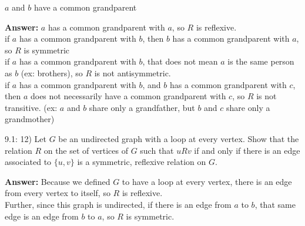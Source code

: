 \documentclass{article}
\newenvironment{answer}
{\color{PineGreen}\begin{list}{}%
         {\setlength{\leftmargin}{1cm}}%
         \item[]%
        \textbf{Answer: }}
{\end{list}}
\begin{document}
\begin{enumerate}[label=\alph{enumi})]
\item $a$ and $b$ have a common grandparent
\begin{answer}
$a$ has a common grandparent with $a$, so $R$ is reflexive.\\
if $a$ has a common grandparent with $b$, then $b$ has a common grandparent with $a$, so $R$ is symmetric\\
if $a$ has a common grandparent with $b$, that does not mean $a$ is the same person as $b$ (ex: brothers), so $R$ is not antisymmetric.\\
if $a$ has a common grandparent with $b$, and $b$ has a common grandparent with $c$, then $a$ does not necessarily have a common grandparent with $c$, so $R$ is not transitive. (ex:  $a$ and $b$ share only a grandfather, but $b$ and $c$ share only a grandmother)\\
\end{answer}
\end{enumerate}

9.1: 12) Let $G$ be an undirected graph with a loop at every vertex.  Show that the relation $R$ on the set of vertices of $G$ such that $uRv$ if and only if there is an edge associated to $\{u,v\}$ is a symmetric, reflexive relation on $G$.
\begin{answer}
Because we defined $G$ to have a loop at every vertex, there is an edge from every vertex to itself, so $R$ is reflexive. \\
Further, since this graph is undirected, if there is an edge from $a$ to $b$, that same edge is an edge from $b$ to $a$, so $R$ is symmetric.\\
\end{answer}
\end{document}
